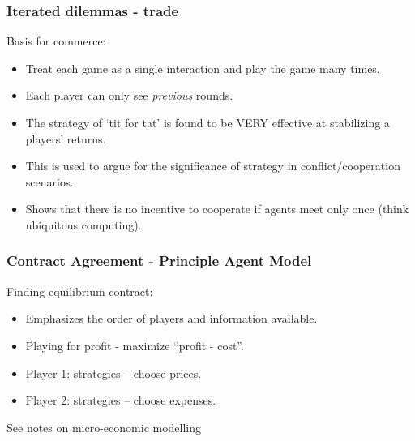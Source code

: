 \documentclass{beamer}
\begin{document}
\begin{frame}
\frametitle{Iterated dilemmas - trade}

Basis for commerce:
\begin{itemize}
\item Treat each game as a single interaction and play the game many times,

\item Each player can only see {\em previous} rounds.

\item The strategy of
`tit for tat' is  found to be VERY effective at stabilizing a players' returns.

\item This is used to argue for the significance of strategy in conflict/cooperation
scenarios.

\item \alert{Shows that there is no incentive to cooperate if agents meet only once} (think
ubiquitous computing).
\end{itemize}

\end{frame}



\begin{frame}
\frametitle{Contract Agreement - Principle Agent Model}


Finding equilibrium contract:\vspace{0.3cm}
\begin{itemize}
\item Emphasizes the order of players and information available.\vspace{0.3cm}

\item Playing for profit - maximize ``profit - cost''.\vspace{0.3cm}

\item Player 1: strategies  -- choose prices.\vspace{0.3cm}

\item Player 2: strategies -- choose expenses.\vspace{0.3cm}
\end{itemize}

\alert{See notes on micro-economic modelling}
\end{frame}
\end{document}
